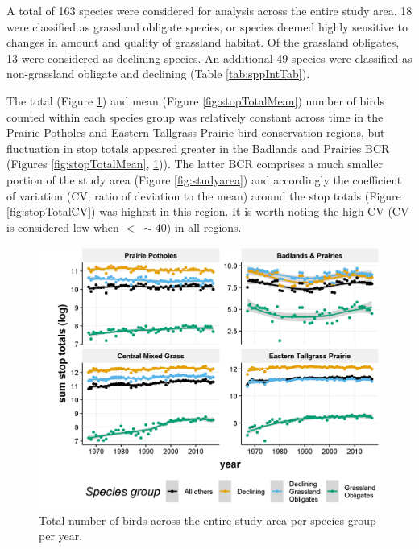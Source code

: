 \documentclass[print]{nuthesis}
\begin{document}
A total of 163 species were considered for analysis across the entire study area. 18 were classified as grassland obligate species, or species deemed highly sensitive to changes in amount and quality of grassland habitat. Of the grassland obligates, 13 were considered as declining species. An additional 49 species were classified as non-grassland obligate and declining (Table \ref{tab:sppIntTab}).

The total (Figure \ref{fig:stopTotalSum}) and mean (Figure \ref{fig:stopTotalMean}) number of birds counted within each species group was relatively constant across time in the Prairie Potholes and Eastern Tallgrass Prairie bird conservation regions, but fluctuation in stop totals appeared greater in the Badlands and Prairies BCR (Figures \ref{fig:stopTotalMean}, \ref{fig:stopTotalSum})). The latter BCR comprises a much smaller portion of the study area (Figure \ref{fig:studyarea}) and accordingly the coefficient of variation (CV; ratio of deviation to the mean) around the stop totals (Figure \ref{fig:stopTotalCV}) was highest in this region. It is worth noting the high CV (CV is considered low when \(<\ \sim40%
\)) in all regions.
\begin{figure}
\includegraphics[width=0.85\linewidth]{.//chapterFiles/discontinuityAnalysis/figsCalledInDiss/stopTotal-byBCR-logSum} \caption{Total number of birds across the entire study area per species group per year. }\label{fig:stopTotalSum}
\end{figure}
\end{document}

